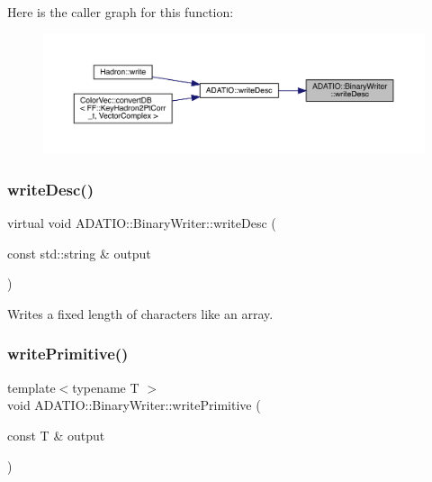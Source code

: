Here is the caller graph for this function\+:\nopagebreak
\begin{figure}[H]
\begin{center}
\leavevmode
\includegraphics[width=350pt]{db/dee/classADATIO_1_1BinaryWriter_a616c82aa0768386f730781d4e8552328_icgraph}
\end{center}
\end{figure}
\mbox{\label{classADATIO_1_1BinaryWriter_a616c82aa0768386f730781d4e8552328}} 
\subsubsection{\texorpdfstring{writeDesc()}{writeDesc()}\hspace{0.1cm}{\footnotesize\ttfamily [2/2]}}
{\footnotesize\ttfamily virtual void A\+D\+A\+T\+I\+O\+::\+Binary\+Writer\+::write\+Desc (\begin{DoxyParamCaption}\item[{const std\+::string \&}]{output }\end{DoxyParamCaption})\hspace{0.3cm}{\ttfamily [virtual]}}



Writes a fixed length of characters like an array. 

\mbox{\label{classADATIO_1_1BinaryWriter_a4415e2d04de75ea6310a8eed3be8f43e}} 
\subsubsection{\texorpdfstring{writePrimitive()}{writePrimitive()}\hspace{0.1cm}{\footnotesize\ttfamily [1/2]}}
{\footnotesize\ttfamily template$<$typename T $>$ \\
void A\+D\+A\+T\+I\+O\+::\+Binary\+Writer\+::write\+Primitive (\begin{DoxyParamCaption}\item[{const T \&}]{output }\end{DoxyParamCaption})\hspace{0.3cm}{\ttfamily [protected]}}



